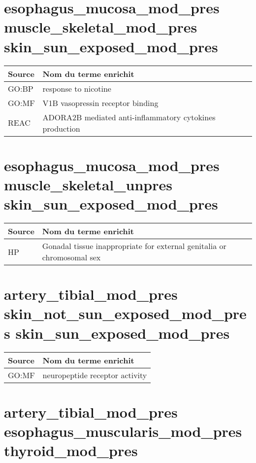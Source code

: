 \section*{esophagus\_mucosa\_mod\_pres \newline muscle\_skeletal\_mod\_pres \newline skin\_sun\_exposed\_mod\_pres}

\begin{longtable}{ll}
\toprule
Source & Nom du terme enrichit\\
\midrule
GO:BP & response to nicotine\\
GO:MF & V1B vasopressin receptor binding\\
REAC & ADORA2B mediated anti-inflammatory cytokines production\\
\bottomrule
\end{longtable}

\section*{esophagus\_mucosa\_mod\_pres \newline muscle\_skeletal\_unpres \newline skin\_sun\_exposed\_mod\_pres}

\begin{longtable}{ll}
\toprule
Source & Nom du terme enrichit\\
\midrule
HP & Gonadal tissue inappropriate for external genitalia or chromosomal sex\\
\bottomrule
\end{longtable}

\section*{artery\_tibial\_mod\_pres \newline skin\_not\_sun\_exposed\_mod\_pres \newline skin\_sun\_exposed\_mod\_pres}

\begin{longtable}{ll}
\toprule
Source & Nom du terme enrichit\\
\midrule
GO:MF & neuropeptide receptor activity\\
\bottomrule
\end{longtable}

\section*{artery\_tibial\_mod\_pres \newline esophagus\_muscularis\_mod\_pres \newline thyroid\_mod\_pres}

